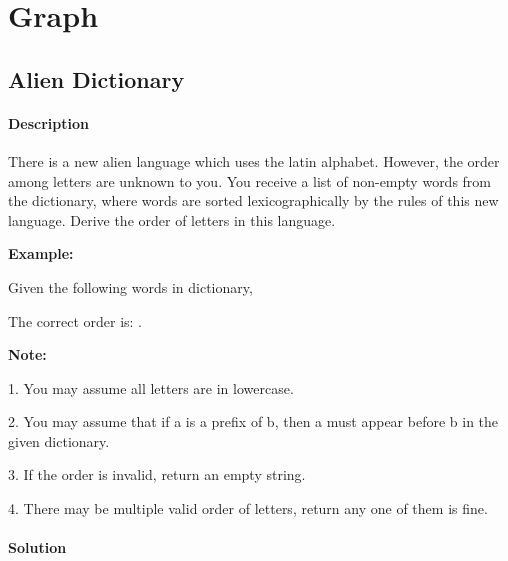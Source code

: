 \chapter{Graph}

\section{Alien Dictionary} %

\subsubsection{Description}
There is a new alien language which uses the latin alphabet. However, the order among letters are unknown to you. You receive a list of non-empty words from the dictionary, where words are sorted lexicographically by the rules of this new language. Derive the order of letters in this language.

\textbf{Example:}

Given the following words in dictionary,
\begin{Code}
\end{Code}

The correct order is: .

\textbf{Note:}

1. You may assume all letters are in lowercase.

2. You may assume that if a is a prefix of b, then a must appear before b in the given dictionary.

3. If the order is invalid, return an empty string.

4. There may be multiple valid order of letters, return any one of them is fine.

\newpage

\subsubsection{Solution}

